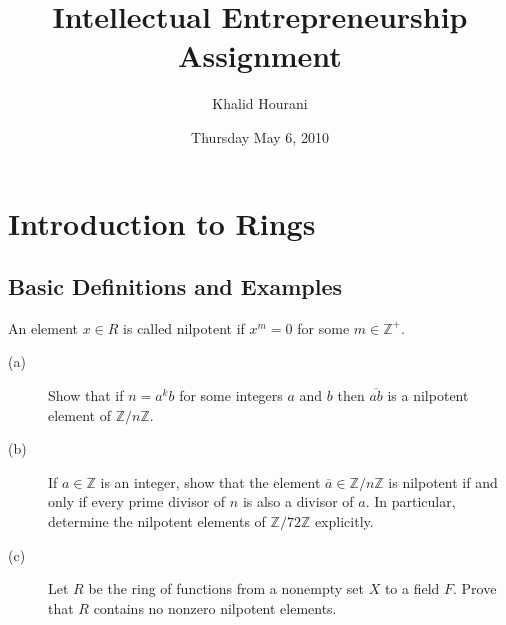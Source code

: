 \documentclass[12pt,leqno]{book}
\title{Intellectual Entrepreneurship Assignment}
\date{Thursday May 6, 2010}
\author{Khalid Hourani}
\numberwithin{equation}{section}
\newcommand{\question}[2] {\vspace{.25in}\noindent\fbox{#1} #2 \vspace{.10in}}
\theoremstyle{definition}
\begin{document}
\maketitle\thispagestyle{empty}
\tableofcontents\thispagestyle{empty}
\thispagestyle{empty}

\setcounter{page}{0}\setcounter{chapter}{6}
\chapter{Introduction to Rings}
\section{Basic Definitions and Examples}

\question{13}{An element $x\in R$ is called nilpotent if $x^m=0$ for some $m\in\mathbb{Z}^+$.}
\begin{description}
 \item [(a)] Show that if $n=a^kb$ for some integers $a$ and $b$ then $\overline{ab}$ is a nilpotent element of $\mathbb{Z}/n\mathbb{Z}$.
 \item [(b)] If $a\in\mathbb{Z}$ is an integer, show that the element $\overline{a}\in\mathbb{Z}/n\mathbb{Z}$ is nilpotent if and only if every prime divisor of $n$ is also a divisor of $a$. In particular, determine the nilpotent elements of $\mathbb{Z}/72\mathbb{Z}$ explicitly.
 \item [(c)] Let $R$ be the ring of functions from a nonempty set $X$ to a field $F$. Prove that $R$ contains no nonzero nilpotent elements.
\end{description}
\end{document}

